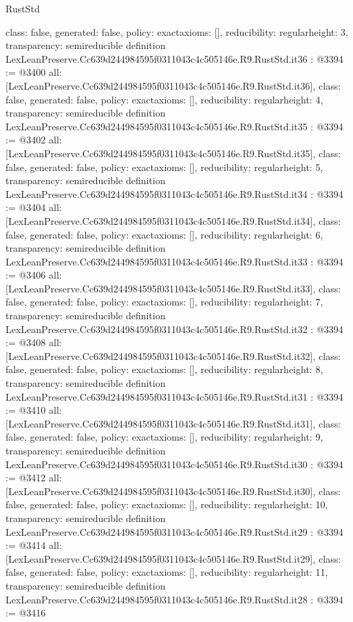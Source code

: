 \begin{lexlean}{RustStd}
\begin{coremodule}
{  class: false,
  generated: false,
  policy: exact{axioms: []},
  reducibility: regular{height: 3},
  transparency: semireducible
}
definition LexLeanPreserve.Cc639d244984595f0311043c4c505146e.R9.RustStd.it36 : @3394 := @3400 {
  all: [LexLeanPreserve.Cc639d244984595f0311043c4c505146e.R9.RustStd.it36],
  class: false,
  generated: false,
  policy: exact{axioms: []},
  reducibility: regular{height: 4},
  transparency: semireducible
}
definition LexLeanPreserve.Cc639d244984595f0311043c4c505146e.R9.RustStd.it35 : @3394 := @3402 {
  all: [LexLeanPreserve.Cc639d244984595f0311043c4c505146e.R9.RustStd.it35],
  class: false,
  generated: false,
  policy: exact{axioms: []},
  reducibility: regular{height: 5},
  transparency: semireducible
}
definition LexLeanPreserve.Cc639d244984595f0311043c4c505146e.R9.RustStd.it34 : @3394 := @3404 {
  all: [LexLeanPreserve.Cc639d244984595f0311043c4c505146e.R9.RustStd.it34],
  class: false,
  generated: false,
  policy: exact{axioms: []},
  reducibility: regular{height: 6},
  transparency: semireducible
}
definition LexLeanPreserve.Cc639d244984595f0311043c4c505146e.R9.RustStd.it33 : @3394 := @3406 {
  all: [LexLeanPreserve.Cc639d244984595f0311043c4c505146e.R9.RustStd.it33],
  class: false,
  generated: false,
  policy: exact{axioms: []},
  reducibility: regular{height: 7},
  transparency: semireducible
}
definition LexLeanPreserve.Cc639d244984595f0311043c4c505146e.R9.RustStd.it32 : @3394 := @3408 {
  all: [LexLeanPreserve.Cc639d244984595f0311043c4c505146e.R9.RustStd.it32],
  class: false,
  generated: false,
  policy: exact{axioms: []},
  reducibility: regular{height: 8},
  transparency: semireducible
}
definition LexLeanPreserve.Cc639d244984595f0311043c4c505146e.R9.RustStd.it31 : @3394 := @3410 {
  all: [LexLeanPreserve.Cc639d244984595f0311043c4c505146e.R9.RustStd.it31],
  class: false,
  generated: false,
  policy: exact{axioms: []},
  reducibility: regular{height: 9},
  transparency: semireducible
}
definition LexLeanPreserve.Cc639d244984595f0311043c4c505146e.R9.RustStd.it30 : @3394 := @3412 {
  all: [LexLeanPreserve.Cc639d244984595f0311043c4c505146e.R9.RustStd.it30],
  class: false,
  generated: false,
  policy: exact{axioms: []},
  reducibility: regular{height: 10},
  transparency: semireducible
}
definition LexLeanPreserve.Cc639d244984595f0311043c4c505146e.R9.RustStd.it29 : @3394 := @3414 {
  all: [LexLeanPreserve.Cc639d244984595f0311043c4c505146e.R9.RustStd.it29],
  class: false,
  generated: false,
  policy: exact{axioms: []},
  reducibility: regular{height: 11},
  transparency: semireducible
}
definition LexLeanPreserve.Cc639d244984595f0311043c4c505146e.R9.RustStd.it28 : @3394 := @3416 {
}
\end{coremodule}
\end{lexlean}

